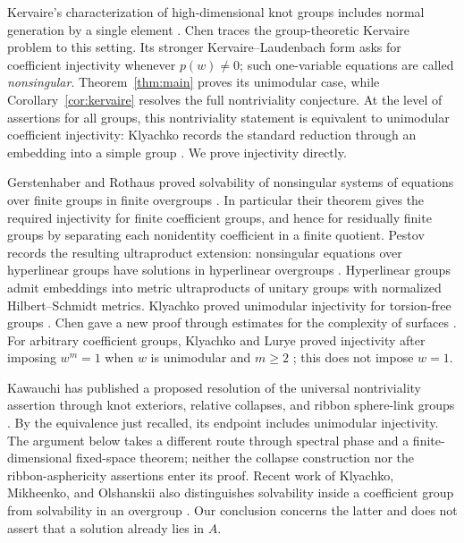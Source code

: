 Kervaire's characterization of high-dimensional knot groups includes
normal generation by a single element \cite[Theorem 1.1]{Kervaire1965}.
Chen \cite[preprint Section 1]{Chen2026} traces the group-theoretic
Kervaire problem to this setting. Its stronger Kervaire--Laudenbach form
asks for coefficient injectivity whenever $p(w)\ne0$; such one-variable
equations are called \emph{nonsingular}. Theorem~\ref{thm:main} proves its
unimodular case, while Corollary~\ref{cor:kervaire} resolves the full
nontriviality conjecture.
At the level of assertions for all groups, this nontriviality statement
is equivalent to unimodular coefficient injectivity: Klyachko records the
standard reduction through an embedding into a simple group
\cite[preprint Section 3, Proposition 2]{Klyachko2004}.
We prove injectivity directly.

Gerstenhaber and Rothaus proved solvability of nonsingular systems of
equations over finite groups in finite overgroups
\cite[Theorem 2]{GerstenhaberRothaus1962}.
In particular their theorem gives the required injectivity for finite
coefficient groups, and hence for residually finite groups by separating
each nonidentity coefficient in a finite quotient.
Pestov records the resulting ultraproduct extension: nonsingular
equations over hyperlinear groups have solutions in hyperlinear
overgroups \cite[preprint Corollary 10.4]{Pestov2008}.
Hyperlinear groups admit embeddings into metric ultraproducts of unitary
groups with normalized Hilbert--Schmidt metrics.
Klyachko proved unimodular injectivity for torsion-free groups
\cite[Theorem 4, exponent-one case]{Klyachko1993}. Chen gave a new proof
through estimates for the complexity of surfaces
\cite[preprint Theorem 6.9]{Chen2026}. For arbitrary coefficient groups,
Klyachko and Lurye proved injectivity after imposing $w^m=1$ when $w$ is
unimodular and $m\geq2$
\cite[preprint Section 1, Theorem; Section 5]{KlyachkoLurye2012}; this does not impose
$w=1$.

Kawauchi has published a proposed resolution of the universal
nontriviality assertion through knot exteriors, relative collapses, and
ribbon sphere-link groups \cite[Theorem 1 and Corollary 2]{Kawauchi2024}.
By the equivalence just recalled, its endpoint includes unimodular
injectivity. The argument below takes a different route through spectral
phase and a finite-dimensional fixed-space theorem; neither the collapse
construction nor the ribbon-asphericity assertions enter its proof.
Recent work of Klyachko, Mikheenko, and Olshanskii also distinguishes
solvability inside a coefficient group from solvability in an overgroup
\cite[Sections 1 and 3]{KlyachkoMikheenkoOlshanskii2026}.
Our conclusion concerns the latter and does not assert that a solution
already lies in $A$.

